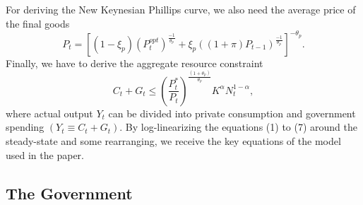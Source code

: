 \documentclass[12pt,a4paper,oneside,titlepage]{article}
\begin{document}
For deriving the New Keynesian Phillips curve, we also need the average price of the final goods
\begin{equation}
P_t = \left[\left(1 - \xi_p\right)\left(P_t^{opt}\right)^{\frac{-1}{\theta_p}} + \xi_p \left(\left(1 + \pi\right)P_{t-1}\right)^{\frac{-1}{\theta_p}} \right]^{-\theta_p}.
\end{equation}
Finally, we have to derive the aggregate resource constraint
\begin{equation}
C_t + G_t \leq \left(\frac{P_t^*}{P_t}\right)^{\frac{\left(1+\theta_p\right)}{\theta_p}} K^\alpha N_t^{1-\alpha},
\end{equation}
where actual output $Y_t$ can be divided into private consumption and government spending $\left(Y_t \equiv C_t + G_t \right)$.\newline
By log-linearizing the equations (1) to (7) around the steady-state and some rearranging, we receive the key equations of the model used in the \citet{Erceg.2014} paper.

\subsection*{The Government}
\end{document}
